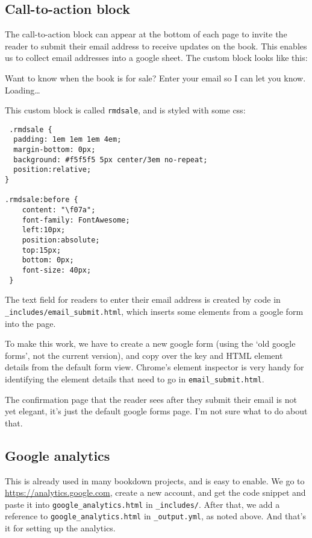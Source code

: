 \documentclass[]{book}
\let\BeginKnitrBlock\begin \let\EndKnitrBlock\end
\begin{document}
\subsection{Call-to-action block}\label{call-to-action-block}

The call-to-action block can appear at the bottom of each page to invite
the reader to submit their email address to receive updates on the book.
This enables us to collect email addresses into a google sheet. The
custom block looks like this:

\BeginKnitrBlock{rmdsale}
Want to know when the book is for sale? Enter your email so I can let
you know. Loading\ldots{}
\EndKnitrBlock{rmdsale}

This custom block is called \texttt{rmdsale}, and is styled with some
css:

\begin{verbatim}
 .rmdsale {
  padding: 1em 1em 1em 4em;
  margin-bottom: 0px;
  background: #f5f5f5 5px center/3em no-repeat;
  position:relative;
}

.rmdsale:before {
    content: "\f07a";
    font-family: FontAwesome;
    left:10px;
    position:absolute;
    top:15px;
    bottom: 0px;
    font-size: 40px;
 }
\end{verbatim}

The text field for readers to enter their email address is created by
code in \texttt{\_includes/email\_submit.html}, which inserts some
elements from a google form into the page.

To make this work, we have to create a new google form (using the `old
google forms', not the current version), and copy over the key and HTML
element details from the default form view. Chrome's element inspector
is very handy for identifying the element details that need to go in
\texttt{email\_submit.html}.

The confirmation page that the reader sees after they submit their email
is not yet elegant, it's just the default google forms page. I'm not
sure what to do about that.

\subsection{Google analytics}\label{google-analytics}

This is already used in many bookdown projects, and is easy to enable.
We go to \url{https://analytics.google.com}, create a new account, and
get the code snippet and paste it into \texttt{google\_analytics.html}
in \texttt{\_includes/}. After that, we add a reference to
\texttt{google\_analytics.html} in \texttt{\_output.yml}, as noted
above. And that's it for setting up the analytics.
\end{document}
